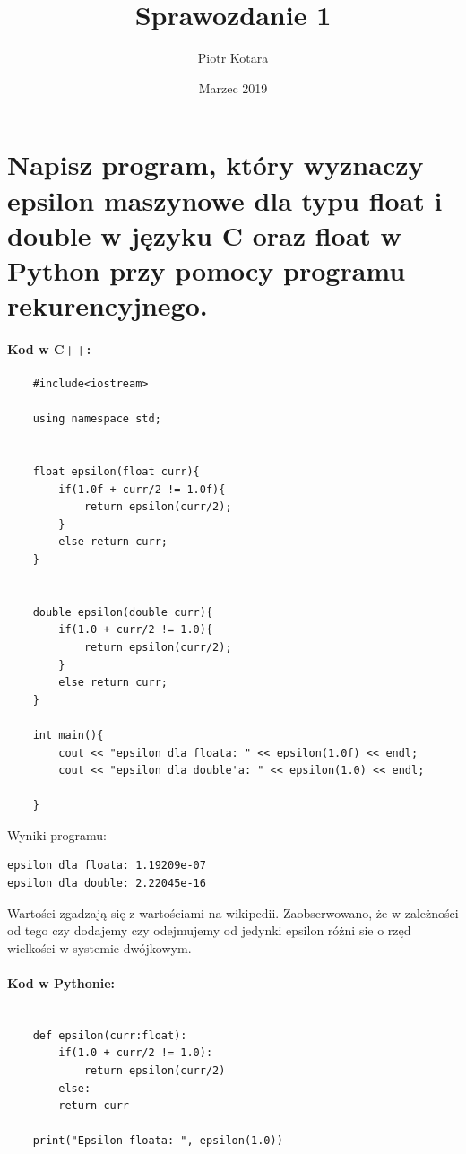 \documentclass{article}
\title{Sprawozdanie 1}
\author{Piotr Kotara}
\date{Marzec 2019}
\begin{document}
\maketitle

\section{Napisz program, który wyznaczy epsilon maszynowe dla typu float i double w języku C oraz float w Python przy pomocy programu rekurencyjnego.
}

\paragraph{Kod w C++:}

\begin{verbatim}
	#include<iostream>

	using namespace std;


	float epsilon(float curr){
		if(1.0f + curr/2 != 1.0f){
			return epsilon(curr/2);
		}
		else return curr;
	}


	double epsilon(double curr){
		if(1.0 + curr/2 != 1.0){
			return epsilon(curr/2);
		}
		else return curr;
	}

	int main(){
		cout << "epsilon dla floata: " << epsilon(1.0f) << endl;
		cout << "epsilon dla double'a: " << epsilon(1.0) << endl;

	}
\end{verbatim}


Wyniki programu:

\begin{lstlisting}
epsilon dla floata: 1.19209e-07
epsilon dla double: 2.22045e-16
\end{lstlisting}


Wartości zgadzają się z wartościami na wikipedii. Zaobserwowano, że w zależności od tego czy dodajemy czy odejmujemy od jedynki epsilon różni sie o rzęd wielkości w systemie dwójkowym.
\clearpage
\newpage
\paragraph{Kod w Pythonie:}

\begin{verbatim}
	
	def epsilon(curr:float):
		if(1.0 + curr/2 != 1.0):
			return epsilon(curr/2)
		else: 
		return curr
	
	print("Epsilon floata: ", epsilon(1.0))
\end{verbatim}
\end{document}
